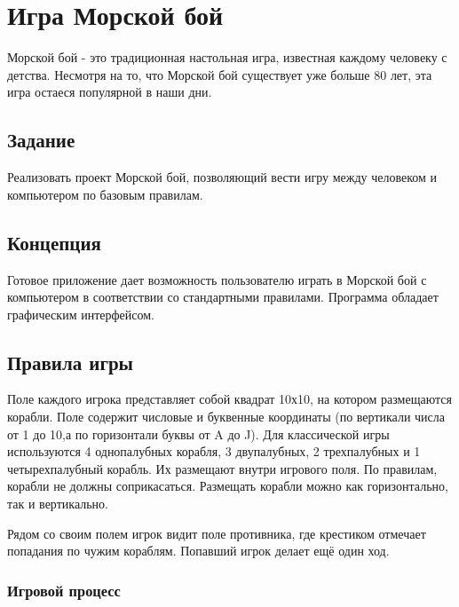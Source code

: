 \documentclass[a4paper]{article}
\begin{document}
\vfill %








\tableofcontents
\newpage



\section{Игра Морской бой}

Морской бой - это традиционная настольная игра, известная каждому человеку с детства. Несмотря на то, что Морской бой существует уже больше 80 лет, эта игра остаеся популярной в наши дни.

\subsection{Задание}

Реализовать проект Морской бой, позволяющий вести игру между человеком и компьютером по базовым правилам.

\subsection{Концепция}

Готовое приложение дает возможность пользователю играть в Морской бой с компьютером в соответствии со стандартными правилами. Программа обладает графическим интерфейсом.

\subsection{Правила игры}

Поле каждого игрока представляет собой квадрат 10х10, на котором размещаются корабли. Поле содержит числовые и буквенные координаты (по вертикали числа от 1 до 10,а по горизонтали буквы от A до J). Для классической игры используются 4 однопалубных корабля, 3 двупалубных, 2 трехпалубных и 1 четырехпалубный корабль. Их размещают внутри игрового поля. По правилам, корабли не должны соприкасаться. Размещать корабли можно как горизонтально, так и вертикально.

Рядом со своим полем игрок видит поле противника, где крестиком отмечает попадания по чужим кораблям. Попавший игрок делает ещё один ход.

\subsubsection{Игровой процесс}
\end{document}

